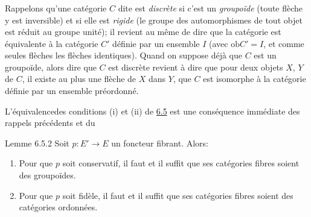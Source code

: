\documentclass[10pt]{../fichiers-configuration-latex/smfart}
\def\labelenumi{(\theenumi)}
\begin{document}
\setcounter{subsection}{5} \setcounter{subsubsection}{0}
\subsubsection{}
Rappelons qu'une catégorie $C$ dite est \emph{discrète} si c'est un
\emph{groupoïde} (\ie toute flèche y est inversible) et si elle
est \emph{rigide} (\ie le groupe des automorphismes de tout objet
est réduit au groupe unité); il revient au même de dire que la
catégorie est équivalente à la catégorie $C'$ définie par un
ensemble $I$ (avec $\text{ob}C'=I$, et comme seules flèches les
flèches identiques). Quand on suppose déjà que $C$ est un
groupoïde, alors dire que $C$ est discrète revient à dire que pour
deux objets $X$, $Y$ de $C$, il existe au plus une flèche de $X$
dans $Y$, \ie que $C$ est isomorphe à la catégorie définie par un
ensemble préordonné.

L'équivalence\pageoriginale des conditions (i) et (ii) de
\hyperref[I.prop6.5]{6.5} est une conséquence immédiate des rappels précédents
et du

\begin{enonce*}{Lemme 6.5.2}
Soit $p:E'\rightarrow E$ un foncteur fibrant. Alors:
\begin{enumerate}
\renewcommand{\theenumi}{\roman{enumi}}
\renewcommand{\labelenumi}{(\theenumi)}
\item Pour que $p$ soit conservatif, il faut et il suffit que ses
  catégories fibres soient des groupoïdes.

\item Pour que $p$ soit fidèle, il faut et il suffit que ses
  catégories fibres soient des catégories ordonnées.
\end{enumerate}
\end{enonce*}
\end{document}
